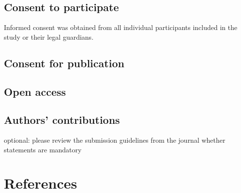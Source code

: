 \documentclass[
  man,floatsintext]{apa6}
\begin{document}
\hypertarget{consent-to-participate}{%
\subsection{Consent to participate}\label{consent-to-participate}}

Informed consent was obtained from all individual participants included in the study or their legal guardians.

\hypertarget{consent-for-publication}{%
\subsection{Consent for publication}\label{consent-for-publication}}

\hypertarget{open-access}{%
\subsection{Open access}\label{open-access}}

\hypertarget{authors-contributions}{%
\subsection{Authors' contributions}\label{authors-contributions}}

optional: please review the submission guidelines from the journal whether statements are mandatory

\newpage

\hypertarget{references}{%
\section{References}\label{references}}

\begingroup
\setlength{\parindent}{-0.5in}
\setlength{\leftskip}{0.5in}
\end{document}
